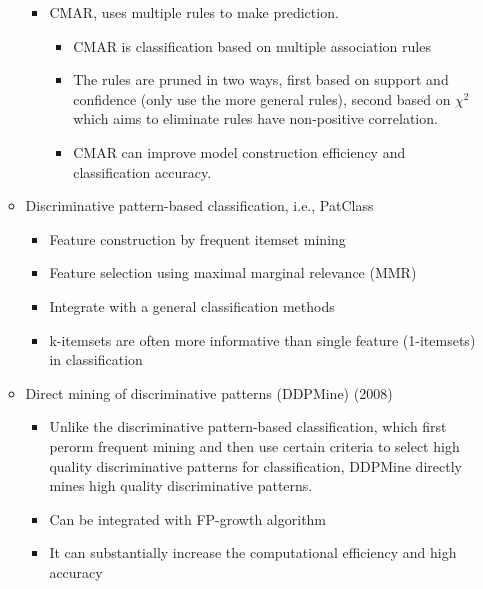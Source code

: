 \documentclass[12pt, a4paper]{article}
\begin{document}
\begin{enumerate}
\begin{itemize}
\begin{itemize}
       \item CMAR, uses multiple rules to make prediction.
       \begin{itemize}
        \item CMAR is classification based on multiple association rules
        \item The rules are pruned in two ways, first based on support and confidence (only use the more general rules), second based on $\chi ^2$ which aims to eliminate rules have non-positive correlation.
        \item CMAR can improve model construction efficiency and classification accuracy.
       \end{itemize}
      \end{itemize}
     
     \item Discriminative pattern-based classification, i.e., PatClass
     \begin{itemize}
      \item Feature construction by frequent itemset mining
      \item Feature selection using maximal marginal relevance (MMR)
      \item Integrate with a general classification methods
      \item k-itemsets are often more informative than single feature (1-itemsets) in classification
     \end{itemize}
     
     \item Direct mining of discriminative patterns (DDPMine) (2008)
     \begin{itemize}
      \item Unlike the discriminative pattern-based classification, which first perorm frequent mining and then use certain criteria to select high quality discriminative patterns for classification, DDPMine directly mines high quality discriminative patterns.
      \item Can be integrated with FP-growth algorithm
      \item It can substantially increase the computational efficiency and high accuracy
     \end{itemize}
    \end{itemize}
\end{enumerate}
\end{document}
